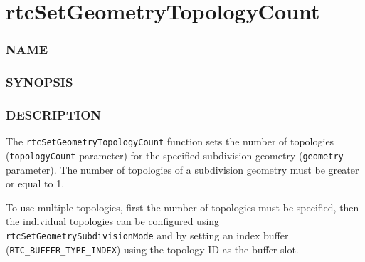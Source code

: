 \pagebreak

\section{rtcSetGeometryTopologyCount}\label{rtcsetgeometrytopologycount}

\subsubsection{NAME}\label{name}

\begin{Shaded}
\begin{Highlighting}[]
\OperatorTok{{-}}
\end{Highlighting}
\end{Shaded}

\subsubsection{SYNOPSIS}\label{synopsis}

\begin{Shaded}
\begin{Highlighting}[]

\OperatorTok{(}
\OperatorTok{,}
   
\OperatorTok{);}
\end{Highlighting}
\end{Shaded}

\subsubsection{DESCRIPTION}\label{description}

The \texttt{rtcSetGeometryTopologyCount} function sets the number of
topologies (\texttt{topologyCount} parameter) for the specified
subdivision geometry (\texttt{geometry} parameter). The number of
topologies of a subdivision geometry must be greater or equal to 1.

To use multiple topologies, first the number of topologies must be
specified, then the individual topologies can be configured using
\texttt{rtcSetGeometrySubdivisionMode} and by setting an index buffer
(\texttt{RTC\_BUFFER\_TYPE\_INDEX}) using the topology ID as the buffer
slot.

